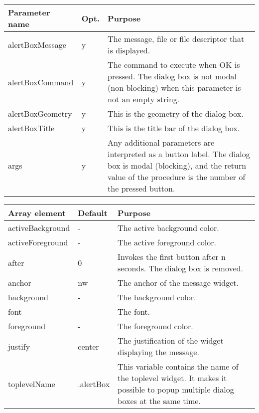 {\newpage
\clearpage
\samepage \begin{tabular}{|l|l|p{6.5cm}|} \hline
Parameter name    & Opt. & Purpose\\  \hline
alertBoxMessage   & y    & The message, file or file
                           descriptor that is displayed.\\  \hline
alertBoxCommand	  & y    & The command to execute when OK is
                           pressed. The dialog box is not modal
                           (non blocking) when this parameter
                           is not an empty string.\\  \hline
alertBoxGeometry  & y    & This is the geometry of the dialog
                           box.\\  \hline
alertBoxTitle     & y    & This is the title bar of the
                           dialog box.\\  \hline
args              & y    & Any additional parameters are
                           interpreted as a button label.
                           The dialog box is modal
                           (blocking), and the return value
                           of the procedure is the number of
                           the pressed button.\\  \hline
\end{tabular}
}

{\newpage
\clearpage
\samepage \begin{tabular}{|l|l|p{5.5cm}|} \hline
Array element     & Default   & Purpose\\  \hline
activeBackground  & -         & The active background color.\\  \hline
activeForeground  & -         & The active foreground color.\\  \hline
after             & 0         & Invokes the first button after
                                n seconds. The dialog box 
                                is removed.\\  \hline
anchor            & nw        & The anchor of the message widget.\\  \hline
background        & -         & The background color.\\  \hline
font              & -         & The font.\\  \hline
foreground        & -         & The foreground color.\\  \hline
justify           & center    & The justification of the
                                widget displaying the
                                message.\\  \hline
toplevelName      & .alertBox & This variable contains the
                                name of the toplevel widget.
                                It makes it possible to
                                popup multiple dialog boxes
                                at the same time.\\  \hline
\end{tabular}
}

